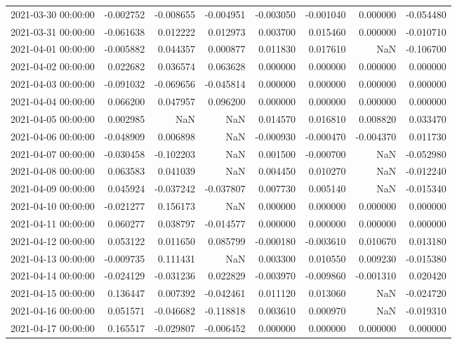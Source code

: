 \begin{tabular}{lrrrrrrr}
2021-03-30 00:00:00 & -0.002752 & -0.008655 & -0.004951 & -0.003050 & -0.001040 & 0.000000 & -0.054480 \\
2021-03-31 00:00:00 & -0.061638 & 0.012222 & 0.012973 & 0.003700 & 0.015460 & 0.000000 & -0.010710 \\
2021-04-01 00:00:00 & -0.005882 & 0.044357 & 0.000877 & 0.011830 & 0.017610 & NaN & -0.106700 \\
2021-04-02 00:00:00 & 0.022682 & 0.036574 & 0.063628 & 0.000000 & 0.000000 & 0.000000 & 0.000000 \\
2021-04-03 00:00:00 & -0.091032 & -0.069656 & -0.045814 & 0.000000 & 0.000000 & 0.000000 & 0.000000 \\
2021-04-04 00:00:00 & 0.066200 & 0.047957 & 0.096200 & 0.000000 & 0.000000 & 0.000000 & 0.000000 \\
2021-04-05 00:00:00 & 0.002985 & NaN & NaN & 0.014570 & 0.016810 & 0.008820 & 0.033470 \\
2021-04-06 00:00:00 & -0.048909 & 0.006898 & NaN & -0.000930 & -0.000470 & -0.004370 & 0.011730 \\
2021-04-07 00:00:00 & -0.030458 & -0.102203 & NaN & 0.001500 & -0.000700 & NaN & -0.052980 \\
2021-04-08 00:00:00 & 0.063583 & 0.041039 & NaN & 0.004450 & 0.010270 & NaN & -0.012240 \\
2021-04-09 00:00:00 & 0.045924 & -0.037242 & -0.037807 & 0.007730 & 0.005140 & NaN & -0.015340 \\
2021-04-10 00:00:00 & -0.021277 & 0.156173 & NaN & 0.000000 & 0.000000 & 0.000000 & 0.000000 \\
2021-04-11 00:00:00 & 0.060277 & 0.038797 & -0.014577 & 0.000000 & 0.000000 & 0.000000 & 0.000000 \\
2021-04-12 00:00:00 & 0.053122 & 0.011650 & 0.085799 & -0.000180 & -0.003610 & 0.010670 & 0.013180 \\
2021-04-13 00:00:00 & -0.009735 & 0.111431 & NaN & 0.003300 & 0.010550 & 0.009230 & -0.015380 \\
2021-04-14 00:00:00 & -0.024129 & -0.031236 & 0.022829 & -0.003970 & -0.009860 & -0.001310 & 0.020420 \\
2021-04-15 00:00:00 & 0.136447 & 0.007392 & -0.042461 & 0.011120 & 0.013060 & NaN & -0.024720 \\
2021-04-16 00:00:00 & 0.051571 & -0.046682 & -0.118818 & 0.003610 & 0.000970 & NaN & -0.019310 \\
2021-04-17 00:00:00 & 0.165517 & -0.029807 & -0.006452 & 0.000000 & 0.000000 & 0.000000 & 0.000000 \\

\end{tabular}
